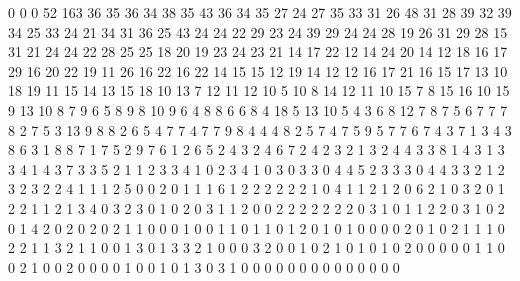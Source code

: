 0
0
0
52
163
36
35
36
34
38
35
43
36
34
35
27
24
27
35
33
31
26
48
31
28
39
32
39
34
25
33
24
21
34
31
36
25
43
24
24
22
29
23
24
39
29
24
24
28
19
26
31
29
28
15
31
21
24
24
22
28
25
25
18
20
19
23
24
23
21
14
17
22
12
14
24
20
14
12
18
16
17
29
16
20
22
19
11
26
16
22
16
22
14
15
15
12
19
14
12
12
16
17
21
16
15
17
13
10
18
19
11
15
14
13
15
18
10
13
7
12
11
12
10
5
10
8
14
12
11
10
15
7
8
15
16
10
15
9
13
10
8
7
9
6
5
8
9
8
10
9
6
4
8
8
6
6
8
4
18
5
13
10
5
4
3
6
8
12
7
8
7
5
6
7
7
7
8
2
7
5
3
13
9
8
8
2
6
5
4
7
7
4
7
7
9
8
4
4
4
8
2
5
7
4
7
5
9
5
7
7
6
7
4
3
7
1
3
4
3
8
6
3
1
8
8
7
1
7
5
2
9
7
6
1
2
6
5
2
4
3
2
4
6
7
2
4
2
3
2
1
3
2
4
4
3
3
8
1
4
3
1
3
3
4
1
4
3
7
3
3
5
2
1
1
2
3
3
4
1
0
2
3
4
1
0
3
0
3
3
0
4
4
5
2
3
3
3
0
4
4
3
3
2
1
2
3
2
3
2
2
4
1
1
1
2
5
0
0
2
0
1
1
1
6
1
2
2
2
2
2
2
1
0
4
1
1
2
1
2
0
6
2
1
0
3
2
0
1
2
2
1
1
2
1
3
4
0
3
2
3
0
1
0
2
0
3
1
1
2
0
0
2
2
2
2
2
2
2
0
3
1
0
1
1
2
2
0
3
1
0
2
0
1
4
2
0
2
0
2
0
2
1
1
0
0
0
1
0
0
1
1
0
1
1
0
1
2
0
1
0
1
0
0
0
0
2
0
1
0
2
1
1
1
0
2
2
1
1
3
2
1
1
0
0
1
3
0
1
3
3
2
1
0
0
0
3
2
0
0
1
0
2
1
0
1
0
1
0
2
0
0
0
0
0
1
1
0
0
2
1
0
0
2
0
0
0
0
1
0
0
1
0
1
3
0
3
1
0
0
0
0
0
0
0
0
0
0
0
0
0
0
